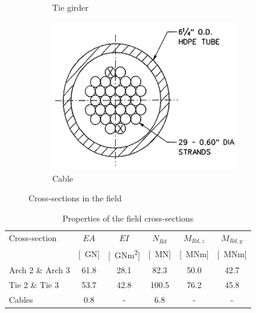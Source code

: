 \begin{figure}[H]
\begin{subfigure}{.33\textwidth}
    \caption{Tie girder}
    \label{fig:cs_tie}
\end{subfigure}%
\begin{subfigure}{.33\textwidth}
    \centering
    \vspace*{1.35cm}
    \includegraphics[width=0.9\textwidth]{overleaf/Appendix/Pictures/cable_3.PNG}
    \vspace*{1.35cm}
    \caption{Cable}
    \label{fig:cs_cable}
\end{subfigure}\caption{Cross-sections in the field}
\label{fig:cross_sections}
\end{figure}

\begin{table}[H]
    \centering
    \caption{Properties of the field cross-sections}
    \label{tab:cs_properties}
    \begin{tabular}{lccccc}
    \toprule
    Cross-section & $EA$ & $EI$ & $N_{Rd}$ & $M_{Rd,z}$ & $M_{Rd,y}$ \\
                  & [\SI{}{GN}]   & [\SI{}{GNm^2}]   & [\SI{}{MN}]  & [\SI{}{MNm}]  & [\SI{}{MNm}] \\ \midrule
    Arch 2 \& Arch 3 & 61.8 & 28.1 & 82.3 & 50.0 & 42.7 \\
    Tie 2 \& Tie 3  & 53.7 & 42.8 & 100.5 & 76.2 & 45.8 \\
    Cables        & 0.8 &  - & 6.8 & - & - \\ \bottomrule
    \end{tabular}
\end{table}

